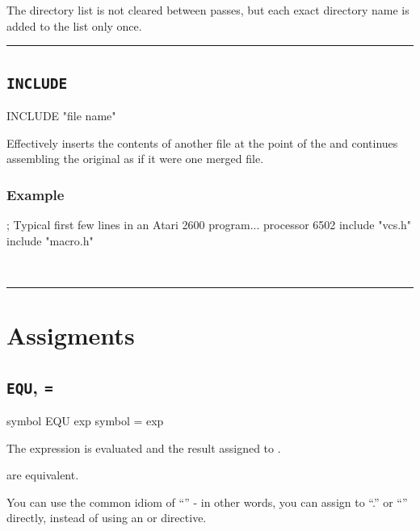 The directory list is not cleared between passes, but each exact directory name is added to the list only once.
\\
\hrule
\subsection{\texttt{INCLUDE}}
\label{pseudoop:include}


\begin{usage}
  INCLUDE "file name"
\end{usage}

Effectively inserts the contents of another file at the point of the  and continues assembling the original as if it were one merged file.

\subsubsection{Example}

\begin{code}[caption=Declaring the Platform]
; Typical first few lines in an Atari 2600 program...
   processor 6502
   include "vcs.h"
   include "macro.h"
\end{code}\\

\hrule

\section{Assigments}

\subsection{\texttt{EQU}, \texttt{=}}
\label{pseudoop:equ}
\label{pseudoop:=}


\begin{usage}
symbol EQU exp
symbol = exp
\end{usage}

The expression is evaluated and the result assigned to
.

 are equivalent.

You can use the common idiom of ``'' - in other words, you can assign to ``.'' or ``\text{*}'' directly, instead of using an  or  directive.

